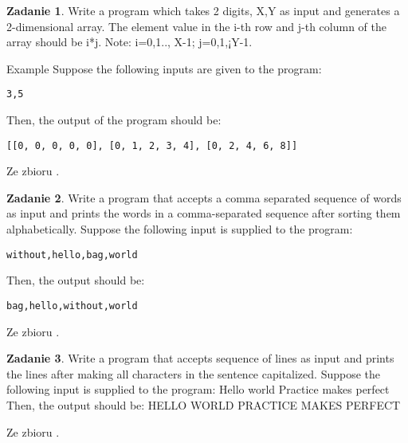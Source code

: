 \documentclass[11pt]{article}
\theoremstyle{definition}
\newtheorem{zadanie}{Zadanie}
\newcommand{\fromA}{\small Ze zbioru \cite{python100}.}
\begin{document}
\begin{zadanie}
Write a program which takes 2 digits, X,Y as input and generates a 2-dimensional array. The element value in the i-th row and j-th column of the array should be i*j.
Note: i=0,1.., X-1; j=0,1,¡­Y-1.

Example
Suppose the following inputs are given to the program:
\begin{verbatim}
3,5
\end{verbatim}
Then, the output of the program should be:
\begin{verbatim}
[[0, 0, 0, 0, 0], [0, 1, 2, 3, 4], [0, 2, 4, 6, 8]] 
\end{verbatim}

\fromA
\end{zadanie}

\begin{zadanie}
Write a program that accepts a comma separated sequence of words as input and prints the words in a comma-separated sequence after sorting them alphabetically.
Suppose the following input is supplied to the program:
\begin{verbatim}
without,hello,bag,world
\end{verbatim}
Then, the output should be:
\begin{verbatim}
bag,hello,without,world
\end{verbatim}

\fromA
\end{zadanie}

\begin{zadanie}
Write a program that accepts sequence of lines as input and prints the lines after making all characters in the sentence capitalized.
Suppose the following input is supplied to the program:
Hello world
Practice makes perfect
Then, the output should be:
HELLO WORLD
PRACTICE MAKES PERFECT

\fromA
\end{zadanie}
\end{document}
